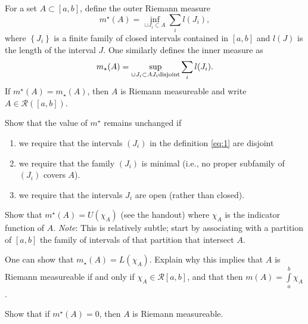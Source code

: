 \documentclass[12pt]{article}
\newenvironment{problem}[2][Problem]{\begin{trivlist}
    \item[\hskip \labelsep {\bfseries #1}\hskip \labelsep {\bfseries #2.}]}{\end{trivlist}}
\theoremstyle{definition}
\begin{document}
For a set \( A \subset [a,b] \), define the outer Riemann measure
\begin{equation}
\label{eq:1}
m^{\star}(A) = \inf_{\cup J_i \subset A} \sum\limits_i l(J_i),
\end{equation}
where \( \left\{ J_i \right\} \) is a finite family of closed intervals contained in \( [a,b] \) and \( l(J) \) is the length of the interval \( J \).
One similarly defines the inner measure as
\begin{equation}
\label{eq:2}
m_{\star}(A) = \sup_{\cup J_i \subset A \\ J_i \text{disjoint}} \sum\limits_i l(J_i).
\end{equation}
If \( m^{\star}(A) = m_{\star}(A) \), then \( A \) is Riemann measureable and write \( A \in \mathcal{R}([a,b]) \).

\begin{problem}{1}
  Show that the value of \( m^{\star} \) remains unchanged if
  \begin{enumerate}
    \item we require that the intervals \( (J_i) \) in the definition \cref{eq:1} are disjoint
    \item we require that the family \( (J_i) \) is minimal (i.e., no proper subfamily of \( (J_i) \) covers \( A \)).
    \item we require that the intervals \( J_i \) are open (rather than closed).
  \end{enumerate}
\end{problem}

\begin{problem}{2}
  Show that \( m^{\star}(A) = U(\chi_A) \) (see the handout) where \(\chi_A\) is the indicator function of \( A \).
  \textit{Note}: This is relatively subtle;
  start by associating with a partition of \( [a,b] \) the family of intervals of that partition that intersect \( A \).
\end{problem}

\begin{problem}{3}
  One can show that \( m_{\star}(A) = L(\chi_A) \).
  Explain why this implies that \( A \) is Riemann measureable if and only if \(\chi_A \in \mathcal{R}[a,b]\), and that then \( m(A) = \int\limits_a^b \chi_A \).
\end{problem}

\begin{problem}{4}
  Show that if \( m^{\star}(A) = 0 \), then \( A \) is Riemann measureable.
\end{problem}
\end{document}
